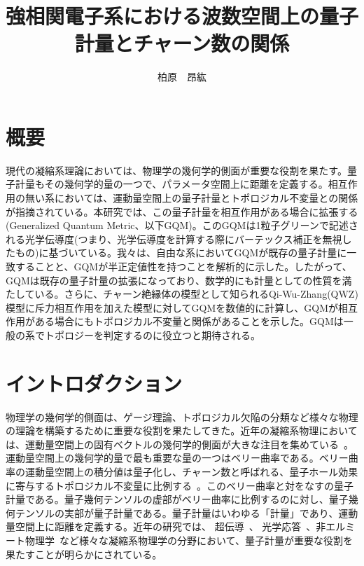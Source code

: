 \documentclass[12pt]{jsbook}
\begin{document}
\title{強相関電子系における波数空間上の量子計量とチャーン数の関係}

\author{柏原　昂紘 }

\maketitle
\frontmatter

\chapter*{概要}
現代の凝縮系理論においては、物理学の幾何学的側面が重要な役割を果たす。量子計量もその幾何学的量の一つで、パラメータ空間上に距離を定義する。相互作用の無い系においては、運動量空間上の量子計量とトポロジカル不変量との関係が指摘されている。本研究では、この量子計量を相互作用がある場合に拡張する(Generalized Quantum Metric、以下GQM)。このGQMは1粒子グリーンで記述される光学伝導度(つまり、光学伝導度を計算する際にバーテックス補正を無視したもの)に基づいている。我々は、自由な系においてGQMが既存の量子計量に一致することと、GQMが半正定値性を持つことを解析的に示した。したがって、GQMは既存の量子計量の拡張になっており、数学的にも計量としての性質を満たしている。さらに、チャーン絶縁体の模型として知られるQi-Wu-Zhang(QWZ)模型に斥力相互作用を加えた模型に対してGQMを数値的に計算し、GQMが相互作用がある場合にもトポロジカル不変量と関係があることを示した。GQMは一般の系でトポロジーを判定するのに役立つと期待される。

\tableofcontents

\mainmatter


\chapter{イントロダクション}
物理学の幾何学的側面は、ゲージ理論、トポロジカル欠陥の分類など\cite{nakahara2018geometry}様々な物理の理論を構築するために重要な役割を果たしてきた。近年の凝縮系物理においては、運動量空間上の固有ベクトルの幾何学的側面が大きな注目を集めている~\cite{bernevig2013topological,PhysRevX.9.041015,doi:10.1126/sciadv.1501524,Tokura2018,PhysRevLett.115.216806}。運動量空間上の幾何学的量で最も重要な量の一つはベリー曲率である。ベリー曲率の運動量空間上の積分値は量子化し、チャーン数と呼ばれる、量子ホール効果に寄与するトポロジカル不変量に比例する~\cite{PhysRevLett.49.405}。このベリー曲率と対をなすの量子計量である。量子幾何テンソルの虚部がベリー曲率に比例するのに対し、量子幾何テンソルの実部が量子計量である\cite{shapere1989geometric}。量子計量はいわゆる「計量」であり、運動量空間上に距離を定義する。近年の研究では、 超伝導~\cite{Peotta2015,PhysRevLett.126.027002,PhysRevLett.128.087002,2022arXiv220900007H}、 光学応答~\cite{PhysRevB.94.134423,PhysRevB.104.134312,PhysRevResearch.4.013217}、非エルミート物理学~\cite{PhysRevLett.127.107402,PhysRevB.103.125302}など様々な凝縮系物理学の分野において、量子計量が重要な役割を果たすことが明らかにされている。
\end{document}
